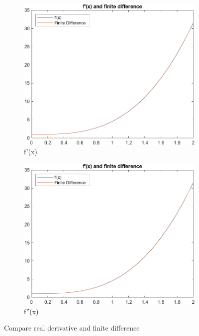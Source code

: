 \documentclass[
	12pt, %
]{fphw}
\begin{document}
\begin{figure}[h!]
	\centering
	\begin{subfigure}[b]{0.4\linewidth}
	  \includegraphics[width=\linewidth]{img/f'(x).png}
	  \caption{f'(x)}
	\end{subfigure}
	\begin{subfigure}[b]{0.4\linewidth}
	  \includegraphics[width=\linewidth]{img/f'(x).png}
	  \caption{f''(x)}
	\end{subfigure}
	\caption{Compare real derivative and finite difference}
	\label{fig:compare}
\end{figure}
\end{document}
